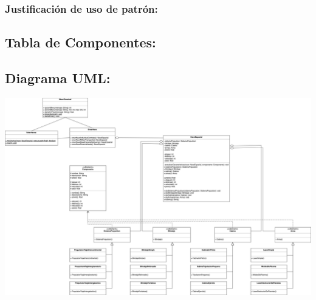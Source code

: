 \documentclass{article}
\begin{document}
\subsubsection*{Justificación de uso de patrón:}


\newpage
\subsection*{Tabla de Componentes:}


\newpage
\subsection*{Diagrama UML:}
\begin{center}
	\includegraphics[scale=0.16]{./Practica04UML.png}
\end{center}
\end{document}
